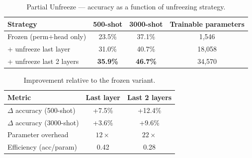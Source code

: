 \begin{table}[h!]
\centering
\caption{Partial Unfreeze --- accuracy as a function of unfreezing strategy.}
\begin{tabular}{l c c c}
\hline
\textbf{Strategy} & \textbf{500-shot} & \textbf{3000-shot} & \textbf{Trainable parameters} \\
\hline
Frozen (perm+head only) & 23.5\% & 37.1\% & 1,546 \\
+ unfreeze last layer & 31.0\% & 40.7\% & 18,058 \\
+ unfreeze last 2 layers & \textbf{35.9\%} & \textbf{46.7\%} & 34,570 \\
\hline
\end{tabular}
\label{tab:partial_unfreeze}
\end{table}

\begin{table}[h!]
\centering
\caption{Improvement relative to the frozen variant.}
\begin{tabular}{l c c}
\hline
\textbf{Metric} & \textbf{Last layer} & \textbf{Last 2 layers} \\
\hline
$\Delta$ accuracy (500-shot) & +7.5\% & +12.4\% \\
$\Delta$ accuracy (3000-shot) & +3.6\% & +9.6\% \\
Parameter overhead & $12\times$ & $22\times$ \\
Efficiency (acc/param) & 0.42 & 0.28 \\
\hline
\end{tabular}
\label{tab:partial_unfreeze_delta}
\end{table}
